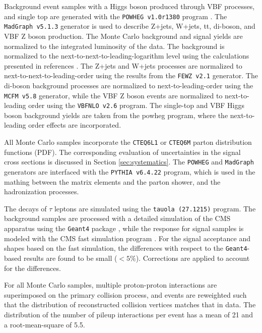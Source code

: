 Background event samples with a Higgs boson produced through VBF processes, and single top are generated with the \texttt{POWHEG v1.0r1380} program \cite{Frixione:2007vw}. 
The \texttt{MadGraph v5.1.3} generator is used to describe Z+jets, W+jets, tt, di-boson, and VBF Z boson production. The Monte Carlo background and signal yields are normalized to the integrated luminosity of the data. 
The \ttbar background is normalized to the next-to-next-to-leading-logarithm level using the calculations presented in references \cite{Czakon:2013goa,Melnikov:2006kv}. 
The Z+jets and W+jets processes are normalized to next-to-next-to-leading-order using the results from the \texttt{FEWZ v2.1} \cite{Gavin:2010az} generator. 
The di-boson background processes are normalized to next-to-leading-order using the \texttt{MCFM v5.8} \cite{Campbell:2010ff} generator, while the VBF Z boson events are normalized to next-to-leading order using the \texttt{VBFNLO v2.6} \cite{Arnold:2008rz,Arnold:2011wj}program. 
The single-top and VBF Higgs boson background yields are taken from the powheg program, where the next-to-leading order effects are incorporated.

All Monte Carlo samples incorporate the \texttt{CTEQ6L1} \cite{Pumplin:2002vw} or \texttt{CTEQ6M} \cite{Nadolsky:2008zw} parton distribution functions (PDF). The corresponding evaluation of uncertainties in the signal cross sections is discussed in Section \ref{sec:systematics}. The \texttt{POWHEG} and \texttt{MadGraph} generators are interfaced with the \texttt{PYTHIA v6.4.22} \cite{Sjostrand:2006za} program, which is used in the mathing between the matrix elements and the parton shower, and the hadronization processes. 


The decays of $\tau$ leptons are simulated using the \texttt{tauola (27.1215)} \cite{Davidson:2010rw} program. The background samples are processed with a detailed simulation of the CMS apparatus using the \texttt{Geant4} package \cite{Agostinelli:2002hh}, while the response for signal samples is modeled with the CMS fast simulation program \cite{Abdullin:2011zz}. For the signal acceptance and \mjj shapes based on the fast simulation, the differences with respect to the \texttt{Geant4}-based results are found to be small ($< 5\%$). Corrections are applied to account for the differences. 

For all Monte Carlo samples, multiple proton-proton interactions are superimposed on the primary collision process, and events are reweighted such that the distribution of reconstructed collision vertices matches that in data. The distribution of the number of pileup interactions per event has a mean of 21 and a root-mean-square of 5.5. 

